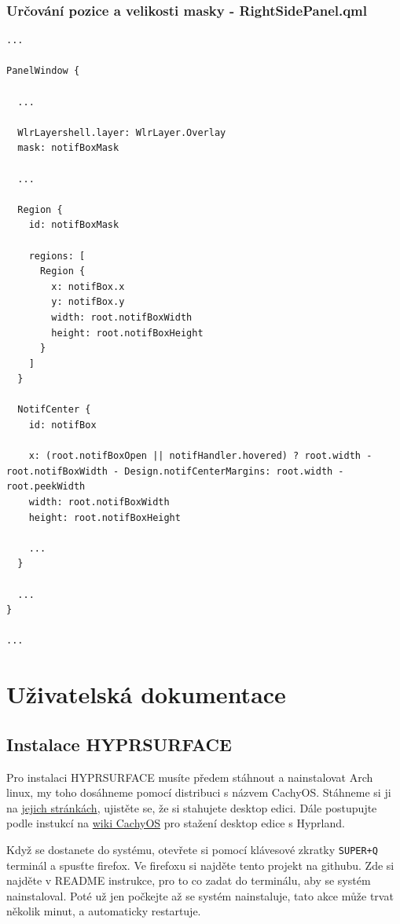 \documentclass[12pt,a4paper]{article}
\begin{document}
\subsubsection{Určování pozice a velikosti masky - RightSidePanel.qml}
\label{RightSidePanel.qml 0}
\begin{lstlisting}
...

PanelWindow {

  ...

  WlrLayershell.layer: WlrLayer.Overlay
  mask: notifBoxMask

  ...

  Region {
    id: notifBoxMask

    regions: [
      Region {
        x: notifBox.x
        y: notifBox.y
        width: root.notifBoxWidth
        height: root.notifBoxHeight
      }
    ]
  }

  NotifCenter {
    id: notifBox

    x: (root.notifBoxOpen || notifHandler.hovered) ? root.width - root.notifBoxWidth - Design.notifCenterMargins: root.width - root.peekWidth
    width: root.notifBoxWidth
    height: root.notifBoxHeight

    ...
  }

  ...
}

...
\end{lstlisting}



\newpage
\section{Uživatelská dokumentace}
\subsection{Instalace HYPRSURFACE}
Pro instalaci HYPRSURFACE musíte předem stáhnout a nainstalovat Arch linux, my toho dosáhneme pomocí distribuci s názvem
CachyOS. \autocite{CachyOSBlazinglyFast} Stáhneme si ji na \href{https://cachyos.org/download/}{jejich stránkách}, 
ujistěte se, že si stahujete desktop edici. Dále postupujte podle instukcí na \href{https://wiki.cachyos.org/installation/installation_on_root/}
{wiki CachyOS} pro stažení desktop edice s Hyprland.

Když se dostanete do systému, otevřete si pomocí klávesové zkratky \verb|SUPER+Q| terminál a spusťte firefox. Ve firefoxu si najděte
tento projekt na githubu. Zde si najděte v README instrukce, pro to co zadat do terminálu, aby se systém nainstaloval. Poté už jen
počkejte až se systém nainstaluje, tato akce může trvat několik minut, a automaticky restartuje.
\end{document}
